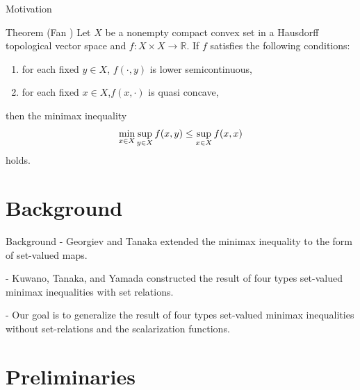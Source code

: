 \documentclass[aspectratio=169, dvipdfmx, 11pt]{beamer}
\newcommand{\RealNumberSet}{\mathbb{R}}
\begin{document}
\begin{frame}{Motivation}
  \begin{block}{Theorem (Fan \cite{MR341029})}
    Let $X$ be a nonempty compact convex set in a Hausdorff topological vector space and $f \colon X \times X \to \RealNumberSet$. If $f$ satisfies
    the following conditions:
    \begin{enumerate}
      \item for each fixed $y \in X$, $f(\cdot,y)$ is lower semicontinuous,
      \item for each fixed $x \in X$,$f(x,\cdot)$ is quasi concave,
    \end{enumerate}
    then the minimax inequality
    \begin{equation}
      \min_{x \in X} \sup_{y \in X} f(x,y) \leq \sup_{x \in X} f(x,x) \notag
    \end{equation}
    holds.
  \end{block}
\end{frame}

\section{Background}

\begin{frame}{Background}
  - Georgiev and Tanaka \cite{MR1807037} extended the minimax inequality to the form of set-valued maps.

  - Kuwano, Tanaka, and Yamada \cite{MR2778674} constructed the result of four types set-valued minimax inequalities
  with set relations.

  - Our goal is to generalize the result of four types set-valued minimax inequalities without set-relations and the scalarization functions.
\end{frame}

\section{Preliminaries}
\end{document}
